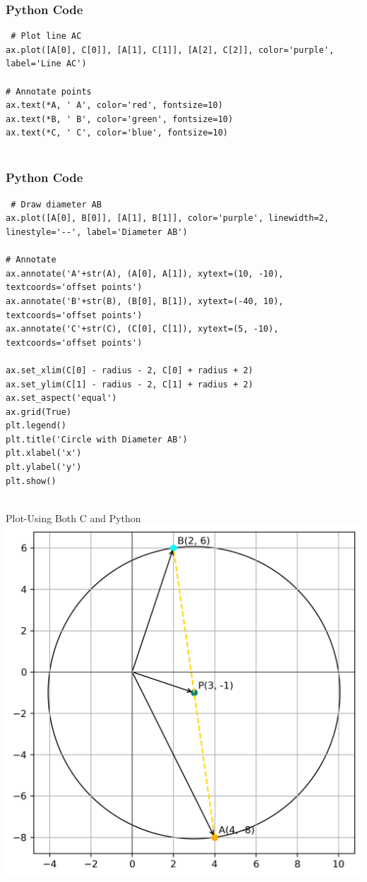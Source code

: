 \documentclass{beamer}
\begin{document}
\begin{frame}[fragile]
    \frametitle{Python Code}

    \begin{lstlisting}
 # Plot line AC
ax.plot([A[0], C[0]], [A[1], C[1]], [A[2], C[2]], color='purple', label='Line AC')

# Annotate points
ax.text(*A, ' A', color='red', fontsize=10)
ax.text(*B, ' B', color='green', fontsize=10)
ax.text(*C, ' C', color='blue', fontsize=10)


    \end{lstlisting}
\end{frame}

\begin{frame}[fragile]
    \frametitle{Python Code}

    \begin{lstlisting}
 # Draw diameter AB
ax.plot([A[0], B[0]], [A[1], B[1]], color='purple', linewidth=2, linestyle='--', label='Diameter AB')

# Annotate
ax.annotate('A'+str(A), (A[0], A[1]), xytext=(10, -10), textcoords='offset points')
ax.annotate('B'+str(B), (B[0], B[1]), xytext=(-40, 10), textcoords='offset points')
ax.annotate('C'+str(C), (C[0], C[1]), xytext=(5, -10), textcoords='offset points')

ax.set_xlim(C[0] - radius - 2, C[0] + radius + 2)
ax.set_ylim(C[1] - radius - 2, C[1] + radius + 2)
ax.set_aspect('equal')
ax.grid(True)
plt.legend()
plt.title('Circle with Diameter AB')
plt.xlabel('x')
plt.ylabel('y')
plt.show()


\end{lstlisting}
\end{frame}
\begin{frame}{Plot-Using Both C and Python}
    \centering
    \includegraphics[width=\columnwidth, height=0.8\textheight, keepaspectratio]{figs/fig1.2.png}     
\end{frame}
\end{document}
